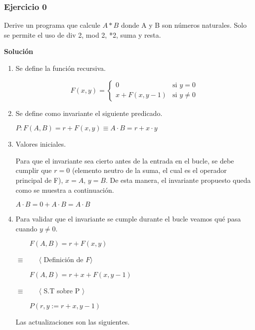 \documentclass[hidelinks]{article}
\begin{document}
\newpage

\subsubsection{Ejercicio 0}

Derive un programa que calcule $A * B$ donde A y B son números naturales. Solo
se permite el uso de div 2, mod 2, *2, suma y resta.\par

\textbf{Solución}\par

\begin{enumerate}
	\item Se define la función recursiva.\par

	      \begin{equation}
		      F(x,y) =
		      \begin{cases}
			      0               & \text{si } y = 0    \\
			      x + F(x, y - 1) & \text{si } y \neq 0
		      \end{cases}
	      \end{equation} \par

	\item Se define como invariante el siguiente predicado.\par
	      \begin{center}
		      $P: F(A,B) = r + F(x,y) \equiv A \cdot B = r + x \cdot y$\par
	      \end{center}

	\item Valores iniciales.\par
	      Para que el invariante sea cierto antes de la entrada en el bucle, se debe
	      cumplir que $r = 0$ (elemento neutro de la suma, el cual es el operador
	      principal de F), $x = A$, $y = B$. De esta manera, el invariante propuesto
	      queda como se muestra a continuación.\par

	      $A \cdot B = 0 + A \cdot B = A \cdot B$\par
	\item Para validar que el invariante se cumple durante el bucle veamos qué pasa
	      cuando $y \neq 0$.\par
	      $\qquad F(A,B) = r + F(x,y)$\par
	      $\equiv \qquad \langle $ Definición de $ F \rangle$\par
	      $\qquad F(A,B) = r + x + F(x, y - 1)$\par
	      $\equiv \qquad \langle $ S.T sobre P $\rangle$\par
	      $\qquad P(r,y := r + x, y - 1)$\par
	      Las actualizaciones son las siguientes.\par


\end{enumerate}
\end{document}
